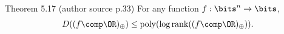 \begin{originalresult}{Theorem 5.17 (author source p.33)}
For any function $f:\bits^n\to\bits$,
\[D((f\comp\OR)_\oplus)\le\operatorname{poly}(\log\operatorname{rank}((f\comp\OR)_\oplus)).\]
\end{originalresult}
